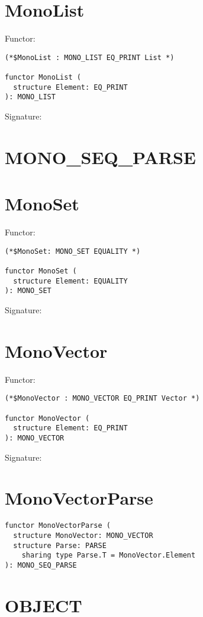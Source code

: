\newpage
\section{MonoList}
Functor:
\begin{verbatim}
(*$MonoList : MONO_LIST EQ_PRINT List *)

functor MonoList (
  structure Element: EQ_PRINT
): MONO_LIST
\end{verbatim}
\bigskip
Signature:


\newpage
\section{MONO\_SEQ\_PARSE}


\newpage
\section{MonoSet}
Functor:
\begin{verbatim}
(*$MonoSet: MONO_SET EQUALITY *)

functor MonoSet (
  structure Element: EQUALITY
): MONO_SET
\end{verbatim}
\bigskip
Signature:


\newpage
\section{MonoVector}
Functor:
\begin{verbatim}
(*$MonoVector : MONO_VECTOR EQ_PRINT Vector *)

functor MonoVector (
  structure Element: EQ_PRINT
): MONO_VECTOR
\end{verbatim}
\bigskip
Signature:


\newpage
\section{MonoVectorParse}
\begin{verbatim}
functor MonoVectorParse (
  structure MonoVector: MONO_VECTOR
  structure Parse: PARSE
    sharing type Parse.T = MonoVector.Element
): MONO_SEQ_PARSE
\end{verbatim}

\newpage
\section{OBJECT}


